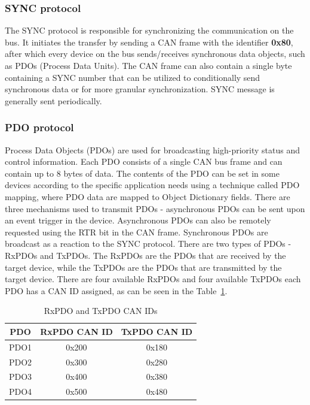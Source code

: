 \subsubsection{SYNC protocol}
The SYNC protocol is responsible for synchronizing the communication on the bus.
It initiates the transfer by sending a CAN frame with the identifier \textbf{0x80}, after which every device on the bus sends/receives synchronous data objects, such as PDOs (Process Data Units).
The CAN frame can also contain a single byte containing a SYNC number that can be utilized to conditionally send synchronous data or for more granular synchronization\cite{can_in_automation_can_2021}.
SYNC message is generally sent periodically.

\subsubsection{PDO protocol}
Process Data Objects (PDOs) are used for broadcasting high-priority status and control information\cite{can_in_automation_can_2021}.
Each PDO consists of a single CAN bus frame and can contain up to 8 bytes of data.
The contents of the PDO can be set in some devices according to the specific application needs using a technique called PDO mapping, where PDO data are mapped to Object Dictionary fields.
There are three mechanisms used to transmit PDOs - asynchronous PDOs can be sent upon an event trigger in the device.
Asynchronous PDOs can also be remotely requested using the RTR bit in the CAN frame.
Synchronous PDOs are broadcast as a reaction to the SYNC protocol.
There are two types of PDOs - RxPDOs and TxPDOs.
The RxPDOs are the PDOs that are received by the target device, while the TxPDOs are the PDOs that are transmitted by the target device.
There are four available RxPDOs and four available TxPDOs each PDO has a CAN ID assigned, as can be seen in the Table~\ref{tab:pdo}.

\begin{table}[H]
    \centering
    \begin{tabular}{ |c|c|c| }
        \hline
        PDO & RxPDO CAN ID & TxPDO CAN ID \\
        \hline
        \hline
        PDO1 & 0x200 & 0x180 \\
        \hline
        PDO2 & 0x300 & 0x280 \\
        \hline
        PDO3 & 0x400 & 0x380 \\
        \hline
        PDO4 & 0x500 & 0x480 \\
        \hline
    \end{tabular}
    \caption{RxPDO and TxPDO CAN IDs\cite{noauthor_canopen_2021}}
    \label{tab:pdo}
\end{table}

